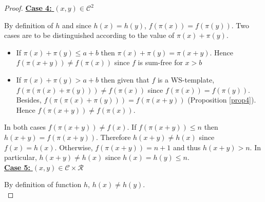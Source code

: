 \documentclass{article}
\newtheorem{computational theorem}[definition]{Computational Theorem}
\begin{document}
\begin{proof}
\noindent \underline{\textbf{Case 4:} \((x,y) \in \mathcal{C}^2\)}
\par
By definition of \(h\) and since \(h(x)=h(y)\), \(f(\pi(x)) = f(\pi(y))\). Two cases are to be distinguished according
to the value of \(\pi(x)+\pi(y)\).
\begin{itemize}
\item If \(\pi(x) + \pi(y) \leqslant a+b\) then \(\pi(x)+\pi(y) = \pi(x + y)\). Hence \(f(\pi(x + y)) \neq f(\pi(x))\) since
	\(f\) is sum-free for \(x>b\)
\item \begin{sloppypar}
	If \(\pi(x)+\pi(y)>a+b\) then given that \(f\) is a WS-template, \({f(\pi(\pi(x)+\pi(y))) \neq f(\pi(x))}\) since
	\({f(\pi(x)) = f(\pi(y))}\). Besides,  \({f(\pi(\pi(x)+\pi(y))) = f(\pi(x + y))}\) (Proposition \ref{prop4}). Hence \({f(\pi(x + y))
	\neq  f(\pi(x))}\).
	\end{sloppypar}
\end{itemize}
\par
In both cases \(f(\pi(x+y)) \neq f(x)\). If  \(f(\pi(x+y)) \leqslant n\) then \(h(x+y) = f(\pi(x+y))\). Therefore
\(h(x+y) \neq h(x)\) since \(f(x) = h(x)\). Otherwise, \(f(\pi(x+y)) = n + 1\) and thus \(h(x+y) > n\). In particular,
\(h(x + y) \neq h(x)\) since \(h(x) = h(y) \leqslant n\). \\

\noindent \underline{\textbf{Case 5:} \((x,y) \in \mathcal{C} \times \mathcal{R}\)}
\par
By definition of function \(h\), \(h(x) \neq h(y)\).\\


\end{proof}
\end{document}
